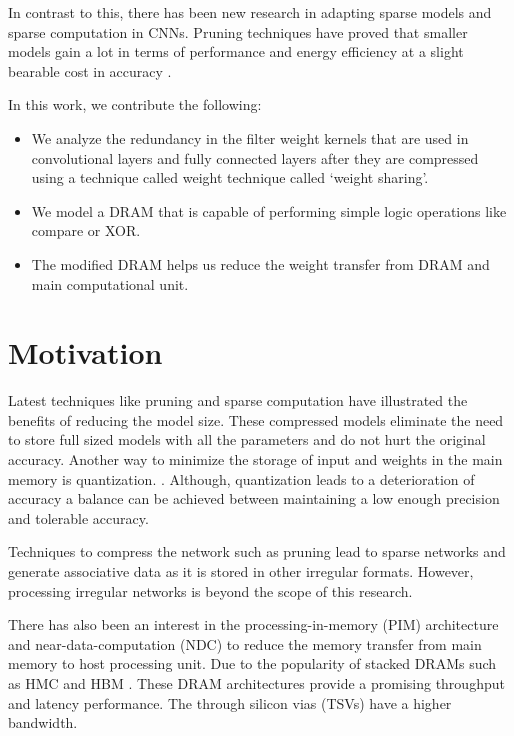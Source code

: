 \documentclass[conference]{IEEEtran}
\begin{document}
In contrast to this, there has been new research in adapting sparse models and sparse computation in CNNs. Pruning techniques have proved that smaller models gain a lot in terms of performance and energy efficiency at a slight bearable cost in accuracy \cite{zhu2017prune, DBLP:journals/corr/abs-1708-04485, han2016eie, liu2018efficient, mao2017exploring, han2016dsd}.

In this work, we contribute the following:
\begin{itemize}
\item We analyze the redundancy in the filter weight kernels that are used in convolutional layers and fully connected layers after they are compressed using a technique called weight technique called `weight sharing'. 
\item We model a DRAM that is capable of performing simple logic operations like compare or XOR.
\item The modified DRAM helps us reduce the weight transfer from DRAM and main computational unit. 
\end{itemize}

\section{Motivation}
Latest techniques like pruning and sparse computation have illustrated the benefits of reducing the model size. 
These compressed models eliminate the need to store full sized models with all the parameters and do not hurt the original accuracy\cite{li2016pruning}. Another way to minimize the storage of input and weights in the main memory is quantization. \cite{wu2016quantized, jouppi2017datacenter, HSong_lecture}. Although, quantization leads to a deterioration of accuracy a balance can be achieved between maintaining a low enough precision and tolerable accuracy. 


Techniques to compress the network such as pruning lead to sparse networks and generate associative data as it is stored in other irregular formats. However, processing irregular networks is beyond the scope of this research. 

There has also been an interest in the processing-in-memory (PIM) architecture and near-data-computation (NDC) to reduce the memory transfer from main memory to host processing unit\cite{kim2016neurocube, gao2017tetris, jiang2017xnor, chi2016prime}. Due to the popularity of stacked DRAMs such as HMC and HBM \cite{black2013hybrid, standard2013high}. These DRAM architectures provide a promising throughput and latency performance. The through silicon vias  (TSVs) have a higher bandwidth. 
\end{document}

